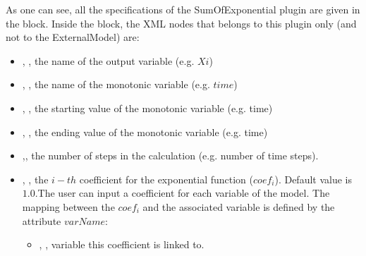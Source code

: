 As one can see, all the specifications of the SumOfExponential plugin are given in the 
 block. Inside the  block,  the XML
nodes that belongs to this plugin only (and not to the ExternalModel) are:
\begin{itemize}
  \item  {}, , the name of the output variable (e.g. $Xi$)
  \item  {}, ,  the name of the monotonic variable (e.g. $time$)
  \item  {}, , the starting value of the monotonic variable (e.g. time)
  \item  {}, , the ending value of the monotonic variable (e.g. time)
  \item  {},, the number of steps in the calculation (e.g. number of time 
  steps).
  \item  {}, , the $i-th$ coefficient for the exponential function ($coef_i$).
  Default value is $1.0$.The user can input a coefficient for each variable  of the model. 
  The mapping between the $coef_i$ and the associated variable is defined by the 
  attribute $varName$:
  \begin{itemize}
    \item {}, , variable this coefficient
    is linked to.
  \end{itemize}
\end{itemize}

